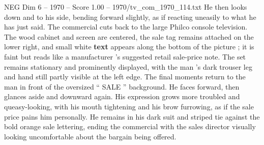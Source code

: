 \begin{textsample}{NEG Dim 6 – 1970 – Score 1.00 – 1970/tv\_com\_1970\_114.txt}
He then looks down and to his side, bending forward slightly, as if reacting uneasily to what he has just said.
The commercial cuts back to the large Philco console television.
The wood cabinet and screen are centered, the sale tag remains attached on the lower right, and small white \textbf{text} appears along the bottom of the picture ; it is faint but reads like a manufacturer ’s suggested retail sale-price note.
The set remains stationary and prominently displayed, with the man ’s dark trouser leg and hand still partly visible at the left edge.
The final moments return to the man in front of the oversized “ SALE ” background.
He faces forward, then glances aside and downward again.
His expression grows more troubled and queasy-looking, with his mouth tightening and his brow furrowing, as if the sale price pains him personally.
He remains in his dark suit and striped tie against the bold orange sale lettering, ending the commercial with the sales director visually looking uncomfortable about the bargain being offered.

\end{textsample}
